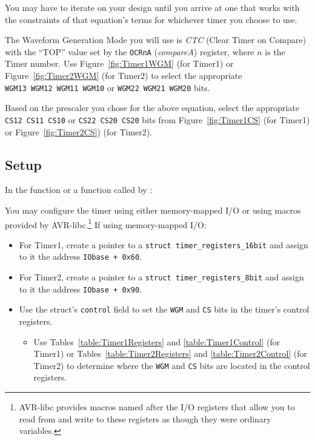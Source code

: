 You may have to iterate on your design until you arrive at one that works with
the constraints of that equation's terms for whichever timer you choose to use.

The Waveform Generation Mode you will use is \textit{CTC} (Clear Timer on
Compare) with the ``TOP'' value set by the \texttt{OCRnA} (\textit{compareA})
register, where $n$ is the Timer number. Use Figure~\ref{fig:Timer1WGM} (for
Timer1) or Figure~\ref{fig:Timer2WGM} (for Timer2) to select the appropriate
\texttt{WGM13}~\texttt{WGM12}~\texttt{WGM11}~\texttt{WGM10} or
\texttt{WGM22}~\texttt{WGM21}~\texttt{WGM20} bits.

Based on the prescaler you chose for the above equation, select the appropriate
\texttt{CS12}~\texttt{CS11}~\texttt{CS10} or
\texttt{CS22}~\texttt{CS20}~\texttt{CS20} bits from Figure~\ref{fig:Timer1CS}
(for Timer1) or Figure~\ref{fig:Timer2CS}) (for Timer2).

\subsection{Setup}

In the  function or a function called by :

You may configure the timer using either memory-mapped I/O or using macros
provided by AVR-libc.\footnote{AVR-libc provides macros named after the I/O
registers that allow you to read from and write to these registers as though
they were ordinary variables.} If using memory-mapped I/O:
\begin{itemize}
\item For Timer1, create a pointer to a
    \lstinline{struct timer_registers_16bit} and assign to it the address
    \lstinline{IObase + 0x60}.
\item For Timer2, create a pointer to a
    \lstinline{struct timer_registers_8bit} and assign to it the address
    \lstinline{IObase + 0x90}.
\item Use the struct's \lstinline{control} field to set the \texttt{WGM} and
    \texttt{CS} bits in the timer's control registers.
    \begin{itemize}
    \item Use Tables~\ref{table:Timer1Registers} and \ref{table:Timer1Control}
        (for Timer1) or Tables~\ref{table:Timer2Registers} and
        \ref{table:Timer2Control} (for Timer2) to determine where the
        \texttt{WGM} and \texttt{CS} bits are located in the control registers.
    \end{itemize}
\end{itemize}

